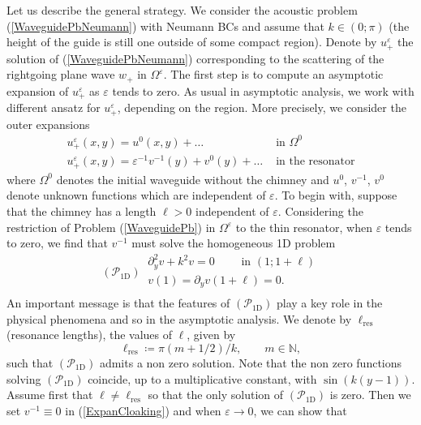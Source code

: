 \documentclass[11pt,a4paper]{report}
\newcommand{\eps}{\varepsilon}
\newcommand{\Om}{\Omega}
\newcommand{\mrm}[1]{\mathrm{#1}}
\newcommand{\N}{\mathbb{N}}
\begin{document}
\newline
Let us describe the general strategy. We consider the acoustic problem (\ref{WaveguidePbNeumann}) with Neumann BCs and assume that $k\in(0;\pi)$ (the height of the guide is still one outside of some compact region). Denote by $u^\eps_+$ the solution of (\ref{WaveguidePbNeumann}) corresponding to the scattering of the rightgoing plane wave $w_+$ in $\Om^\eps$. The first step is to compute an asymptotic expansion of $u^\eps_+$ as $\eps$ tends to zero. As usual in asymptotic analysis, we work with different ansatz for $u^\eps_+$, depending on the region. More precisely, we consider the outer expansions
\begin{equation}\label{ExpanCloaking}
\begin{array}{|ll}
u^\eps_+(x,y)=u^0(x,y) +\dots & \mbox{ in }\Om^0\\[4pt]
u^\eps_+(x,y)=\eps^{-1}v^{-1}(y)+v^0(y)+\dots & \mbox{ in the resonator}
\end{array}
\end{equation}
where $\Om^0$ denotes the initial waveguide without the chimney and $u^0$, $v^{-1}$, $v^0$ denote unknown functions which are independent of $\eps$. To begin with, suppose that the chimney has a length $\ell>0$ independent of $\eps$. Considering the restriction of Problem (\ref{WaveguidePb}) in $\Om^\eps$ to the thin resonator, when $\eps$ tends to zero, we find that $v^{-1}$ must solve the homogeneous 1D problem
\[
(\mathscr{P}_{\mrm{1D}})\ \begin{array}{|l}
\partial^2_yv+k^2v=0\qquad\mbox{ in }(1;1+\ell)\\[3pt]
v(1)=\partial_yv(1+\ell)=0.\\
\end{array}
\]
An important message is that the features of $(\mathscr{P}_{\mrm{1D}})$ play a key role in the physical phenomena  and so in the asymptotic analysis. We denote by $\ell_{\mrm{res}}$ (resonance lengths), the values of $\ell$, given by
\begin{equation}\label{DefResLength}
\ell_{\mrm{res}}\coloneqq\pi (m+1/2)/k,\qquad m\in\N,
\end{equation}
such that $(\mathscr{P}_{\mrm{1D}})$ admits a non zero solution. Note that the non zero functions solving $(\mathscr{P}_{\mrm{1D}})$ coincide, up to a multiplicative constant, with $\sin(k (y-1))$.\\
\newline
Assume first that $\ell\ne\ell_{\mrm{res}}$ so that the only solution of $(\mathscr{P}_{\mrm{1D}})$ is zero. Then we set $v^{-1}\equiv0$ in (\ref{ExpanCloaking}) and when $\eps\to0$, we can show that
\end{document}
